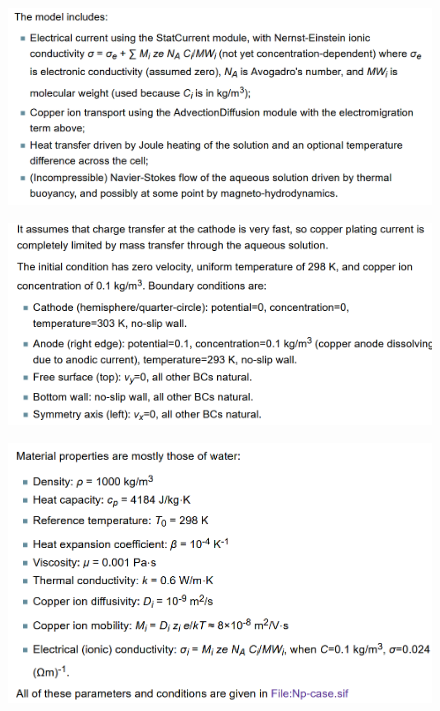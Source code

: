\begin{figure}[H]
\centering
\includegraphics[width=1.0\textwidth]{ec-22}
\end{figure}

\begin{figure}[H]
\centering
\includegraphics[width=1.0\textwidth]{ec-23}
\end{figure}

\begin{figure}[H]
\centering
\includegraphics[width=1.0\textwidth]{ec-24}
\end{figure}

